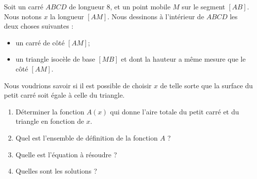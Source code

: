 
\begin{exercice}\label{exosmath-0078}
 
    Soit un carré \( ABCD\) de longueur \unit{8}{\centi\meter}, et un point mobile \( M\) sur le segment \( [AB]\). Nous notons \( x\) la longueur \( [AM]\). Nous dessinons à l'intérieur de \( ABCD\) les deux choses suivantes :
    \begin{itemize}
        \item un carré de côté \( [AM]\);
        \item
            un triangle isocèle de base \( [MB]\) et dont la hauteur a même mesure que le côté \( [AM]\).
    \end{itemize}
    Nous voudrions savoir si il est possible de choisir \( x\) de telle sorte que la surface du petit carré soit égale à celle du triangle.
    \begin{enumerate}
        \item
            Déterminer la fonction \( A(x)\) qui donne l'aire totale du petit carré et du triangle en fonction de \( x\).
        \item
            Quel est l'ensemble de définition de la fonction \( A\) ?
        \item
            Quelle est l'équation à résoudre ?
        \item
            Quelles sont les solutions ?
    \end{enumerate}

\end{exercice}
